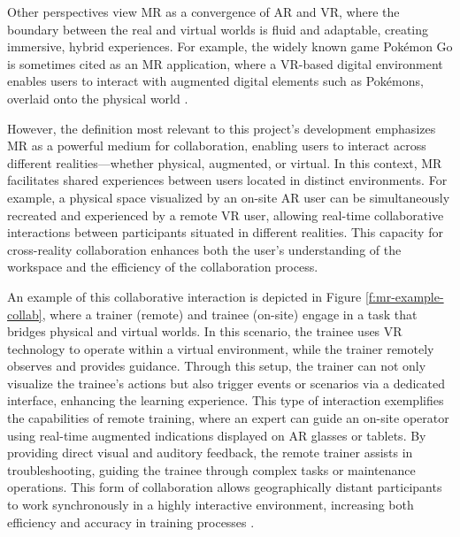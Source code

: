     Other perspectives view \ac{MR} as a convergence of \ac{AR} and \ac{VR}, where the boundary between the real and virtual worlds is fluid and adaptable, creating immersive, hybrid experiences. For example, the widely known game Pokémon Go is sometimes cited as an \ac{MR} application, where a \ac{VR}-based digital environment enables users to interact with augmented digital elements such as Pokémons, overlaid onto the physical world \cite{whatismixedreality}.


    However, the definition most relevant to this project's development emphasizes \ac{MR} as a powerful medium for collaboration, enabling users to interact across different realities—whether physical, augmented, or virtual. In this context, \ac{MR} facilitates shared experiences between users located in distinct environments. For example, a physical space visualized by an on-site \ac{AR} user can be simultaneously recreated and experienced by a remote \ac{VR} user, allowing real-time collaborative interactions between participants situated in different realities. This capacity for cross-reality collaboration enhances both the user’s understanding of the workspace and the efficiency of the collaboration process.


    An example of this collaborative interaction is depicted in Figure \ref{f:mr-example-collab}, where a trainer (remote) and trainee (on-site) engage in a task that bridges physical and virtual worlds. In this scenario, the trainee uses \ac{VR} technology to operate within a virtual environment, while the trainer remotely observes and provides guidance. Through this setup, the trainer can not only visualize the trainee's actions but also trigger events or scenarios via a dedicated interface, enhancing the learning experience. This type of interaction exemplifies the capabilities of remote training, where an expert can guide an on-site operator using real-time augmented indications displayed on \ac{AR} glasses or tablets. By providing direct visual and auditory feedback, the remote trainer assists in troubleshooting, guiding the trainee through complex tasks or maintenance operations. This form of collaboration allows geographically distant participants to work synchronously in a highly interactive environment, increasing both efficiency and accuracy in training processes \cite{Mayer2023}.
  
